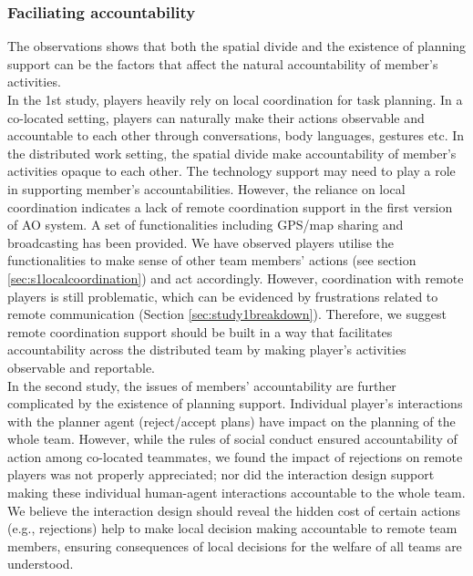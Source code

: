 \subsubsection{Faciliating accountability}\label{sec:conclusionAC}
The observations shows that both the spatial divide and the existence of planning support can be the factors that affect the natural accountability of member's activities. \\

In the 1st study, players heavily rely on local coordination for task planning. In a co-located setting, players can naturally make their actions observable and accountable to each other through conversations, body languages, gestures etc. In the distributed work setting, the spatial divide make accountability of member's activities opaque to each other. The technology support may need to play a role in supporting member's accountabilities. However, the reliance on local coordination indicates a lack of remote coordination support in the first version of \ac{AO} system. A set of functionalities including GPS/map sharing and broadcasting has been provided. We have observed players utilise the functionalities to make sense of other team members' actions (see section \ref{sec:s1localcoordination}) and act accordingly. However, coordination with remote players is still problematic, which can be evidenced by frustrations related to remote communication (Section \ref{sec:study1breakdown}). Therefore, we suggest remote coordination support should be built in a way that facilitates accountability across the distributed team by making player's activities observable and reportable.\\

In the second study, the issues of members' accountability are further complicated by the existence of planning support. Individual player's interactions with the planner agent (reject/accept plans) have impact on the planning of the whole team. However, while the rules of social conduct ensured accountability of action among co-located teammates, we found the impact of rejections on remote players was not properly appreciated; nor did the interaction design support making these individual human-agent interactions accountable to the whole team. We believe the interaction design should reveal the hidden cost of certain actions (e.g., rejections) help to make local decision making accountable to remote team members, ensuring consequences of local decisions for the welfare of all teams are understood. \\

